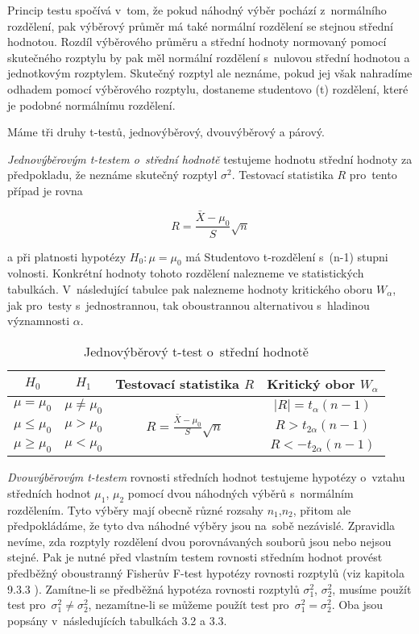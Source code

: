 \documentclass[thesis=B,czech]{FITthesis}[2012/06/26]
\begin{document}
Princip testu spočívá v~tom, že pokud náhodný výběr pochází z~normálního rozdělení, pak výběrový průměr má také normální rozdělení se stejnou střední hodnotou. Rozdíl výběrového průměru a střední hodnoty normovaný pomocí skutečného rozptylu by pak měl normální rozdělení s~nulovou střední hodnotou a jednotkovým rozptylem. Skutečný rozptyl ale neznáme, pokud jej však nahradíme odhadem pomocí výběrového rozptylu, dostaneme studentovo (t) rozdělení, které je podobné normálnímu rozdělení.

Máme tři druhy t-testů, jednovýběrový, dvouvýběrový a párový. 

\textit{Jednovýběrovým t-testem o~střední hodnotě} testujeme hodnotu střední hodnoty za předpokladu, že neznáme skutečný rozptyl $\sigma^2$. Testovací statistika $R$ pro~tento případ je rovna 

$$R=\frac{\bar{X}-\mu_{0}}{S}\sqrt{n}$$

a při platnosti hypotézy $H_{0}:\mu=\mu_{0}$ má Studentovo t-rozdělení s~(n-1) stupni volnosti. Konkrétní hodnoty tohoto rozdělení nalezneme ve statistických tabulkách. V~následující tabulce pak nalezneme hodnoty kritického oboru $W_{\alpha}$, jak pro~testy s~jednostrannou, tak oboustrannou alternativou s~hladinou významnosti $\alpha$.

\begin{table}[ht] \centering
\caption{Jednovýběrový t-test o~střední hodnotě \cite[tab. 9.3.1]{VŠCHT}}
\label{tab:Jednovýběrový t-test o střední hodnotě}
\begin{tabular}{|c|c|c|c|}
\hline
 $H_{0}$ & $H_{1}$ & Testovací statistika $R$ & Kritický obor $W_{\alpha}$  \\ \hline
 $\mu=\mu_{0}$ & $\mu\neq\mu_{0}$ & \multirow{3}{*}{$R=\frac{\bar{X}-\mu_{0}}{S}\sqrt{n}$}  & 
 $\left | R \right |= \mathit{t}_{\alpha}(n-1)$   \\
 $\mu\leq\mu_{0}$ & $\mu>\mu_{0}$ &  &  $R > \mathit{t}_{2\alpha}(n-1)$   \\
$\mu\geq\mu_{0}$ & $\mu<\mu_{0}$ &  & $R < - \mathit{t}_{2\alpha}(n-1)$ \\ \hline
\end{tabular}
\end{table}

\textit{Dvouvýběrovým t-testem} rovnosti středních hodnot testujeme hypotézy o~vztahu středních hodnot $\mu_{1}$, $\mu_{2}$ pomocí dvou náhodných výběrů s~normálním rozdělením. Tyto výběry mají obecně různé rozsahy $n_{1}$,$n_{2}$, přitom ale předpokládáme, že tyto dva náhodné výběry jsou na~sobě nezávislé. Zpravidla nevíme, zda rozptyly rozdělení dvou porovnávaných souborů jsou nebo nejsou stejné. Pak je nutné před vlastním testem rovnosti středním hodnot provést předběžný oboustranný Fisherův F-test hypotézy rovnosti rozptylů (viz kapitola 9.3.3 \cite{VŠCHT}). Zamítne-li se předběžná hypotéza rovnosti rozptylů $\sigma^{2}_{1}$, $\sigma^{2}_{2}$, musíme použít test pro~$\sigma^{2}_{1}\neq\sigma^{2}_{2}$, nezamítne-li se můžeme použít test pro~$\sigma^{2}_{1}=\sigma^{2}_{2}$. Oba jsou popsány v~následujících tabulkách 3.2 a 3.3.
\end{document}
